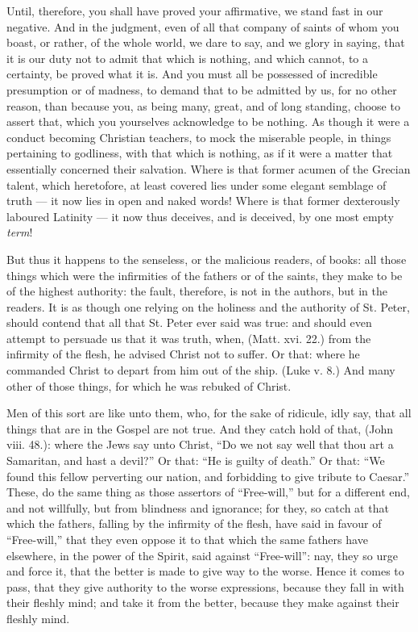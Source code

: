Until, therefore, you shall have proved your affirmative, we stand fast in our negative. And in the judgment, even of all that company of saints of whom you boast, or rather, of the whole world, we dare to say, and we glory in saying, that it is our duty not to admit that which is nothing, and which cannot, to a certainty, be proved what it is. And you must all be possessed of incredible presumption or of madness, to demand that to be admitted by us, for no other reason, than because you, as being many, great, and of long standing, choose to assert that, which you yourselves acknowledge to be nothing. As though it were a conduct becoming Christian teachers, to mock the miserable people, in things pertaining to godliness, with that which is nothing, as if it were a matter that essentially concerned their salvation. Where is that former acumen of the Grecian talent, which heretofore, at least covered lies under some elegant semblage of truth — it now lies in open and naked words! Where is that former dexterously laboured Latinity — it now thus deceives, and is deceived, by one most empty \emph{term}!

But thus it happens to the senseless, or the malicious readers, of books: all those things which were the infirmities of the fathers or of the saints, they make to be of the highest authority: the fault, therefore, is not in the authors, but in the readers. It is as though one relying on the holiness and the authority of St. Peter, should contend that all that St. Peter ever said was true: and should even attempt to persuade us that it was truth, when, (Matt. xvi. 22.) from the infirmity of the flesh, he advised Christ not to suffer. Or that: where he commanded Christ to depart from him out of the ship. (Luke v. 8.) And many other of those things, for which he was rebuked of Christ.

Men of this sort are like unto them, who, for the sake of ridicule, idly say, that all things that are in the Gospel are not true. And they catch hold of that, (John viii. 48.): where the Jews say unto Christ, “Do we not say well that thou art a Samaritan, and hast a devil?” Or that: “He is guilty of death.” Or that: “We found this fellow perverting our nation, and forbidding to give tribute to Caesar.” These, do the same thing as those assertors of “Free-will,” but for a different end, and not willfully, but from blindness and ignorance; for they, so catch at that which the fathers, falling by the infirmity of the flesh, have said in favour of “Free-will,” that they even oppose it to that which the same fathers have elsewhere, in the power of the Spirit, said against “Free-will”: nay, they so urge and force it, that the better is made to give way to the worse. Hence it comes to pass, that they give authority to the worse expressions, because they fall in with their fleshly mind; and take it from the better, because they make against their fleshly mind.

